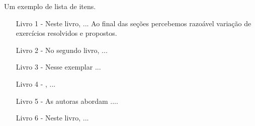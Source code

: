 Um exemplo de lista de itens.

\begin{itemize}
 \item [Livro 1 -\nocite{matcompleta}]  Neste livro, ... Ao final das seções percebemos razoável variação de exercícios resolvidos e propostos.
\vspace{0.5cm}
	 
\item [Livro 2 -\nocite{dante2010matematica}] No segundo livro, ... 
\vspace{0.5cm}

\item [Livro 3 -\nocite{paiva2010matematica}]   Nesse exemplar ... 
\vspace{0.5cm}

\item [Livro 4 - ]   , ...
\vspace{0.5cm}

\item [Livro 5 -\nocite{smole2016matematica}] As autoras abordam ....
\vspace{0.5cm}

\item [Livro 6 -]  Neste livro, ...
\vspace{0.5cm}
 \end{itemize}

